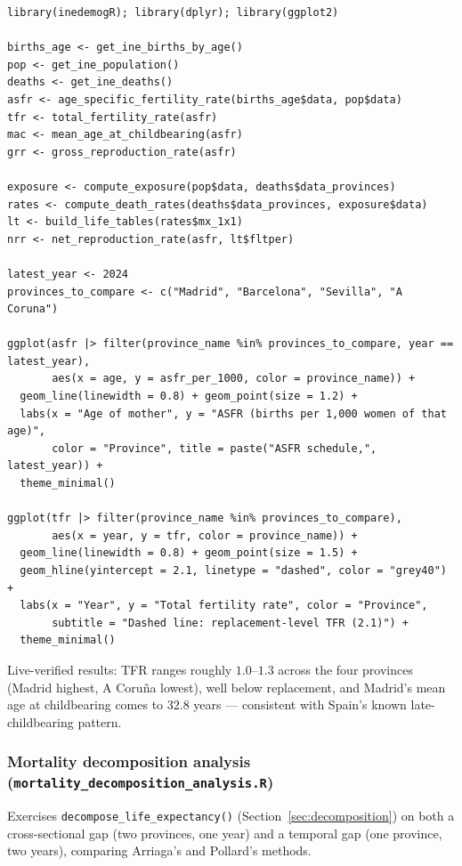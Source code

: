 \documentclass[11pt]{article}
\newcommand{\fn}[1]{\texttt{#1}}
\begin{document}
\begin{lstlisting}
library(inedemogR); library(dplyr); library(ggplot2)

births_age <- get_ine_births_by_age()
pop <- get_ine_population()
deaths <- get_ine_deaths()
asfr <- age_specific_fertility_rate(births_age$data, pop$data)
tfr <- total_fertility_rate(asfr)
mac <- mean_age_at_childbearing(asfr)
grr <- gross_reproduction_rate(asfr)

exposure <- compute_exposure(pop$data, deaths$data_provinces)
rates <- compute_death_rates(deaths$data_provinces, exposure$data)
lt <- build_life_tables(rates$mx_1x1)
nrr <- net_reproduction_rate(asfr, lt$fltper)

latest_year <- 2024
provinces_to_compare <- c("Madrid", "Barcelona", "Sevilla", "A Coruna")

ggplot(asfr |> filter(province_name %in% provinces_to_compare, year == latest_year),
       aes(x = age, y = asfr_per_1000, color = province_name)) +
  geom_line(linewidth = 0.8) + geom_point(size = 1.2) +
  labs(x = "Age of mother", y = "ASFR (births per 1,000 women of that age)",
       color = "Province", title = paste("ASFR schedule,", latest_year)) +
  theme_minimal()

ggplot(tfr |> filter(province_name %in% provinces_to_compare),
       aes(x = year, y = tfr, color = province_name)) +
  geom_line(linewidth = 0.8) + geom_point(size = 1.5) +
  geom_hline(yintercept = 2.1, linetype = "dashed", color = "grey40") +
  labs(x = "Year", y = "Total fertility rate", color = "Province",
       subtitle = "Dashed line: replacement-level TFR (2.1)") +
  theme_minimal()
\end{lstlisting}

Live-verified results: TFR ranges roughly $1.0$--$1.3$ across the four
provinces (Madrid highest, A Coru\~{n}a lowest), well below replacement, and
Madrid's mean age at childbearing comes to $32.8$ years --- consistent with
Spain's known late-childbearing pattern.

\subsubsection{Mortality decomposition analysis (\fn{mortality\_decomposition\_analysis.R})}

Exercises \fn{decompose\_life\_expectancy()} (Section~\ref{sec:decomposition})
on both a cross-sectional gap (two provinces, one year) and a temporal gap
(one province, two years), comparing Arriaga's and Pollard's methods.
\end{document}

